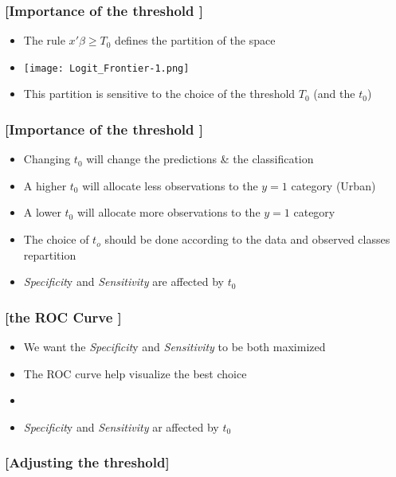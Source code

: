 \documentclass[xcolor=x11names,compress, handhouts]{beamer}
\renewcommand{\(}{\begin{columns}}
\renewcommand{\)}{\end{columns}}
\newcommand{\<}[1]{\begin{column}{#1}}
\renewcommand{\>}{\end{column}}
\begin{document}
\begin{frame} %
\frametitle{\textcolor{brique}{[Importance of the threshold ]}}
\pause
 \begin{itemize}[<+->]
  \item The rule $ x'\beta \geq T_0$ defines the partition of the space
  \item[] \begin{center}\texttt{[image: Logit\_Frontier-1.png]} \end{center}
  \item This partition is sensitive to the choice of the threshold $T_0$ (and the $t_0$)
\end{itemize}
\end{frame}


\begin{frame} %
\frametitle{\textcolor{brique}{[Importance of the threshold ]}}
\pause
 \begin{itemize}[<+->]
  \item Changing $t_0$ will  change the predictions \&  the classification
  \item[] A higher $t_0$ will allocate less observations to the $y=1$ category (Urban)
  \item[] A lower $t_0$ will allocate more observations to the $y=1$ category
  \item The choice of $t_o$ should be done according to the data and observed classes repartition
  \item \textit{Specificit}y and \textit{Sensitivity} are affected by $t_0$
\end{itemize}
\end{frame}


\begin{frame} %
\frametitle{\textcolor{brique}{[the ROC Curve ]}}
\pause
 \begin{itemize}[<+->]
  \item We want the \textit{Specificit}y and \textit{Sensitivity} to be both maximized
  \item The ROC curve help visualize the best choice
  \item 
  \item \textit{Specificit}y and \textit{Sensitivity}  ar affected by $t_0$
\end{itemize}
\end{frame}




\begin{frame} %
\frametitle{\textcolor{brique}{[Adjusting the threshold]}}

\end{frame}
\end{document}
